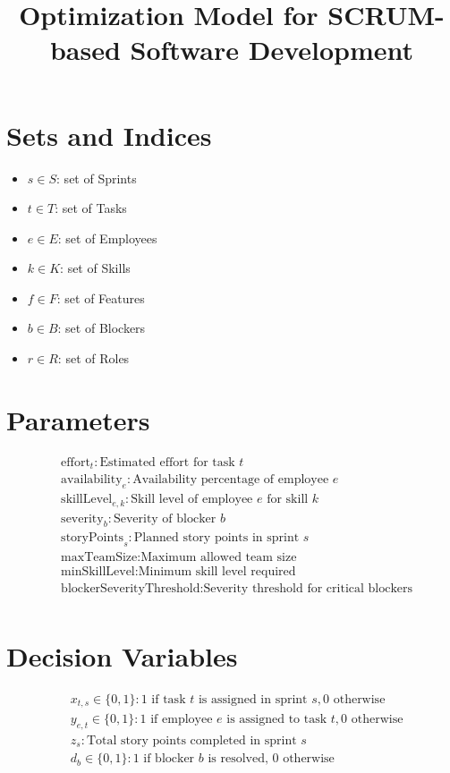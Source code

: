 \documentclass{article}
\title{Optimization Model for SCRUM-based Software Development}
\author{}
\date{}
\begin{document}
\maketitle

\section*{Sets and Indices}
\begin{itemize}
    \item $s \in S$: set of Sprints
    \item $t \in T$: set of Tasks
    \item $e \in E$: set of Employees
    \item $k \in K$: set of Skills
    \item $f \in F$: set of Features
    \item $b \in B$: set of Blockers
    \item $r \in R$: set of Roles
\end{itemize}

\section*{Parameters}
\begin{align*}
    & \text{effort}_t: \text{Estimated effort for task } t \\
    & \text{availability}_e: \text{Availability percentage of employee } e \\
    & \text{skillLevel}_{e,k}: \text{Skill level of employee } e \text{ for skill } k \\
    & \text{severity}_b: \text{Severity of blocker } b \\
    & \text{storyPoints}_s: \text{Planned story points in sprint } s \\
    & \text{maxTeamSize}: \text{Maximum allowed team size} \\
    & \text{minSkillLevel}: \text{Minimum skill level required} \\
    & \text{blockerSeverityThreshold}: \text{Severity threshold for critical blockers} \\
\end{align*}

\section*{Decision Variables}
\begin{align*}
    & x_{t,s} \in \{0,1\}: \text{1 if task } t \text{ is assigned in sprint } s, \text{0 otherwise}\\
    & y_{e,t} \in \{0,1\}: \text{1 if employee } e \text{ is assigned to task } t, \text{0 otherwise}\\
    & z_{s}: \text{Total story points completed in sprint } s \\
    & d_{b} \in \{0,1\}: \text{1 if blocker } b \text{ is resolved, 0 otherwise} \\
\end{align*}
\end{document}

